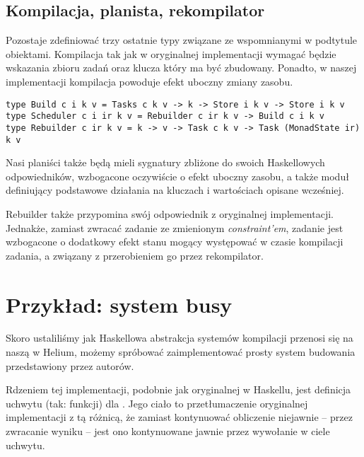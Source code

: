 \subsection{Kompilacja, planista, rekompilator}

Pozostaje zdefiniować trzy ostatnie typy związane ze wspomnianymi w podtytule obiektami. Kompilacja tak jak w oryginalnej implementacji wymagać będzie wskazania zbioru zadań oraz klucza który ma być zbudowany. Ponadto, w  naszej implementacji kompilacja powoduje efekt uboczny zmiany zasobu.

\begin{lstlisting}
type Build c i k v = Tasks c k v -> k -> Store i k v -> Store i k v
type Scheduler c i ir k v = Rebuilder c ir k v -> Build c i k v
type Rebuilder c ir k v = k -> v -> Task c k v -> Task (MonadState ir) k v
\end{lstlisting}

Nasi planiści także będą mieli sygnatury zbliżone do swoich Haskellowych odpowiedników, wzbogacone oczywiście o efekt uboczny zasobu, a także moduł definiujący podstawowe działania na kluczach i wartościach opisane wcześniej.



Rebuilder także przypomina swój odpowiednik z oryginalnej implementacji. Jednakże, zamiast zwracać zadanie ze zmienionym \textit{constraint'em}, zadanie jest wzbogacone o dodatkowy efekt stanu mogący występować w czasie kompilacji zadania, a związany z przerobieniem go przez rekompilator.

\section{Przykład: system busy}

Skoro ustaliliśmy jak Haskellowa abstrakcja systemów kompilacji przenosi się na naszą w Helium, możemy spróbować zaimplementować prosty system budowania  przedstawiony przez autorów.



Rdzeniem tej implementacji, podobnie jak oryginalnej w Haskellu, jest definicja uchwytu (tak: funkcji) dla . Jego ciało to przetłumaczenie oryginalnej implementacji z tą różnicą, że zamiast kontynuować obliczenie niejawnie -- przez zwracanie wyniku -- jest ono kontynuowane jawnie przez wywołanie  w ciele uchwytu.

